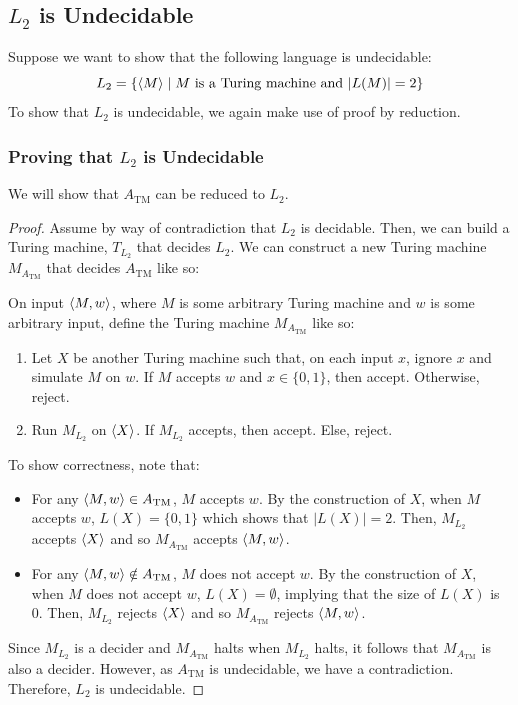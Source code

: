 \documentclass[letterpaper]{article}
\begin{document}
\subsection{\texorpdfstring{$L_2$}{} is Undecidable}
Suppose we want to show that the following language is undecidable:
\[L_2 = \{\langle M \rangle \mid M \text{ is a Turing machine and } |L(M)| = 2\}\]
To show that $L_2$ is undecidable, we again make use of proof by reduction.

\subsubsection{Proving that \texorpdfstring{$L_2$}{} is Undecidable}
We will show that $A_{\text{TM}}$ can be reduced to $L_2$. 
\begin{mdframed}[]
    \begin{proof}
        Assume by way of contradiction that $L_2$ is decidable. Then, we can build a Turing machine, $T_{L_2}$ that decides $L_2$. We can construct a new Turing machine $M_{A_{\text{TM}}}$ that decides $A_{\text{TM}}$ like so:
        \begin{mdframed}[]
            On input $\langle M, w \rangle$, where $M$ is some arbitrary Turing machine and $w$ is some arbitrary input, define the Turing machine $M_{A_{\text{TM}}}$ like so: 
            \begin{enumerate}
                \item Let $X$ be another Turing machine such that, on each input $x$, ignore $x$ and simulate $M$ on $w$. If $M$ accepts $w$ and $x \in \{0, 1\}$, then accept. Otherwise, reject. 
                \item Run $M_{L_2}$ on $\langle X \rangle$. If $M_{L_2}$ accepts, then accept. Else, reject.
            \end{enumerate}
        \end{mdframed}
        To show correctness, note that: 
        \begin{itemize}
            \item For any $\langle M, w \rangle \in A_{\text{TM}}$, $M$ accepts $w$. By the construction of $X$, when $M$ accepts $w$, $L(X) = \{0, 1\}$ which shows that $|L(X)| = 2$. Then, $M_{L_2}$ accepts $\langle X \rangle$ and so $M_{A_{\text{TM}}}$ accepts $\langle M, w \rangle$. 
            \item For any $\langle M, w \rangle \notin A_{\text{TM}}$, $M$ does not accept $w$. By the construction of $X$, when $M$ does not accept $w$, $L(X) = \emptyset$, implying that the size of $L(X)$ is 0. Then, $M_{L_2}$ rejects $\langle X \rangle$ and so $M_{A_{\text{TM}}}$ rejects $\langle M, w \rangle$. 
        \end{itemize}
        Since $M_{L_2}$ is a decider and $M_{A_{\text{TM}}}$ halts when $M_{L_2}$ halts, it follows that $M_{A_{\text{TM}}}$ is also a decider. However, as $A_{\text{TM}}$ is undecidable, we have a contradiction. Therefore, $L_2$ is undecidable. 
    \end{proof}
\end{mdframed}
\end{document}
